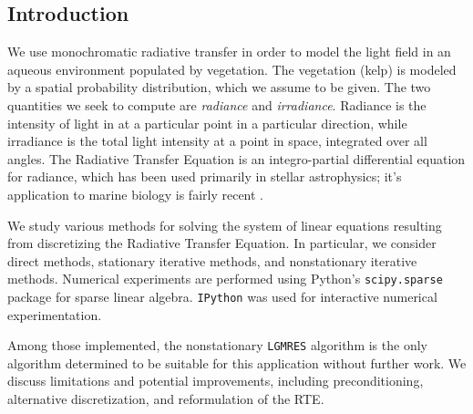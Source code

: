 \documentclass[10pt]{article}
\begin{document}
\begin{multicols}{2}

\section{Introduction}
We use monochromatic radiative transfer in order to model the light field in an aqueous environment populated by vegetation.
The vegetation (kelp) is modeled by a spatial probability distribution, which we assume to be given.
The two quantities we seek to compute are \textit{radiance} and \textit{irradiance}.
Radiance is the intensity of light in at a particular point in a particular direction, while irradiance is the total light intensity at a point in space, integrated over all angles.
The Radiative Transfer Equation is an integro-partial differential equation for radiance, which has been used primarily in stellar astrophysics; it's application to marine biology is fairly recent \citep{mobley_radiative_2001}.

We study various methods for solving the system of linear equations resulting from discretizing the Radiative Transfer Equation.
In particular, we consider direct methods, stationary iterative methods, and nonstationary iterative methods.
Numerical experiments are performed using Python's \texttt{scipy.sparse} \citep{jones_scipy:_2001} package for sparse linear algebra.
\texttt{IPython} \citep{perez_ipython:_2007} was used for interactive numerical experimentation.

Among those implemented, the nonstationary \texttt{LGMRES} \citep{baker_technique_2005} algorithm is the only algorithm determined to be suitable for this application without further work.
We discuss limitations and potential improvements, including preconditioning, alternative discretization, and reformulation of the RTE.


\end{multicols}
\end{document}
